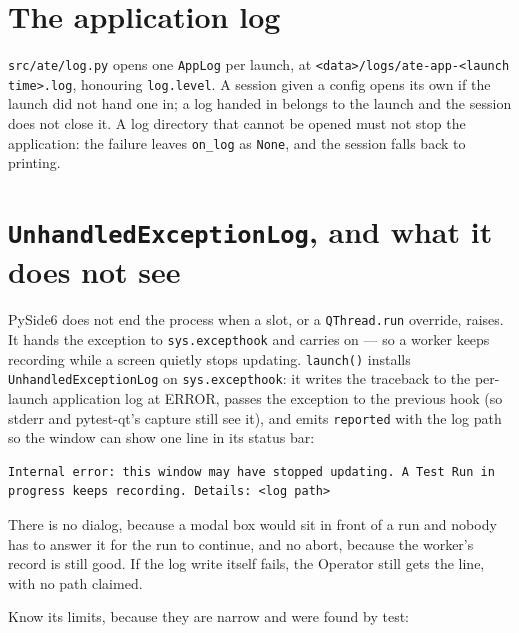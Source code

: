 \section{The application log}

\texttt{src/ate/log.py} opens one \texttt{AppLog} per launch, at
\texttt{<data>/\allowbreak{}logs/\allowbreak{}ate-app-<launch time>.log}, honouring \texttt{log.level}. A session given a config
opens its own if the launch did not hand one in; a log handed in belongs to the launch and the session
does not close it. A log directory that cannot be opened must not stop the application: the failure leaves
\texttt{on\_log} as \texttt{None}, and the session falls back to printing.

\section{\texttt{UnhandledExceptionLog}, and what it does not see}\label{sec:exception}

PySide6 does not end the process when a slot, or a \texttt{QThread.run} override, raises. It hands the
exception to \texttt{sys.excepthook} and carries on --- so a worker keeps recording while a screen quietly
stops updating. \texttt{launch()} installs \texttt{UnhandledExceptionLog} on \texttt{sys.excepthook}: it
writes the traceback to the per-launch application log at ERROR, passes the exception to the previous hook
(so stderr and pytest-qt's capture still see it), and emits \texttt{reported} with the log path so the
window can show one line in its status bar:

\begin{lstlisting}[language=ATEShell]
Internal error: this window may have stopped updating. A Test Run in progress keeps recording. Details: <log path>
\end{lstlisting}

There is no dialog, because a modal box would sit in front of a run and nobody has to answer it for the
run to continue, and no abort, because the worker's record is still good. If the log write itself fails,
the Operator still gets the line, with no path claimed.

Know its limits, because they are narrow and were found by test:

